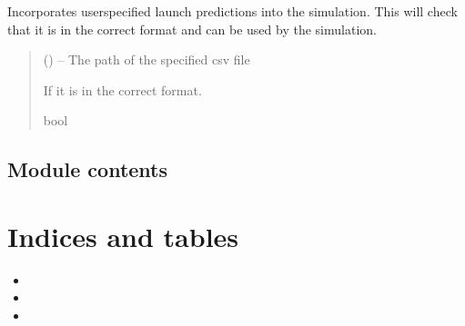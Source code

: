 \documentclass[letterpaper,10pt,english]{sphinxmanual}
\begin{document}
\begin{fulllineitems}
\label{\detokenize{fspsim:fspsim.simulate.set_future_constellations}}
\pysigstartsignatures
{}
\pysigstopsignatures
\sphinxAtStartPar
Incorporates user\sphinxhyphen{}specified launch predictions into the simulation.
This will check that it is in the correct format
and can be used by the simulation.
\begin{quote}\begin{description}
\sphinxAtStartPar
{} () – The path of the specified csv file

\sphinxAtStartPar
If it is in the correct format.

\sphinxAtStartPar
bool

\end{description}\end{quote}

\end{fulllineitems}



\section{Module contents}
\label{\detokenize{fspsim:module-fspsim}}\label{\detokenize{fspsim:module-contents}}

\chapter{Indices and tables}
\label{\detokenize{index:indices-and-tables}}\begin{itemize}
\item {} 
\sphinxAtStartPar
{}

\item {} 
\sphinxAtStartPar
{}

\item {} 
\sphinxAtStartPar
{}

\end{itemize}
\end{document}
